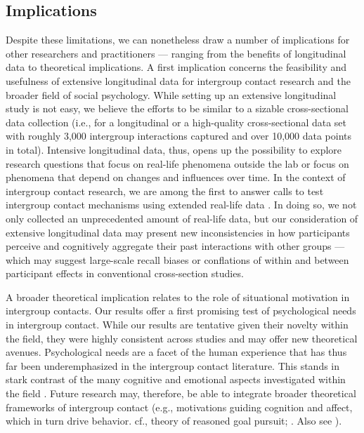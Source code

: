 \documentclass[man, 12pt, a4paper, mask]{apa7}
\theoremstyle{break}
\theoremstyle{plain}
\begin{document}
\subsection{Implications}
Despite these limitations, we can nonetheless draw a number of implications for other researchers and practitioners --- ranging from the benefits of longitudinal data to theoretical implications. A first implication concerns the feasibility and usefulness of extensive longitudinal data for intergroup contact research and the broader field of social psychology. While setting up an extensive longitudinal study is not easy, we believe the efforts to be similar to a sizable cross-sectional data collection (i.e., for a longitudinal or a high-quality cross-sectional data set with roughly 3,000 intergroup interactions captured and over 10,000 data points in total). Intensive longitudinal data, thus, opens up the possibility to explore research questions that focus on real-life phenomena outside the lab or focus on phenomena that depend on changes and influences over time. In the context of intergroup contact research, we are among the first to answer calls to test intergroup contact mechanisms using extended real-life data \citep[e.g.,][]{Pettigrew2011, MacInnis2015}. In doing so, we not only collected an unprecedented amount of real-life data, but our consideration of extensive longitudinal data may present new inconsistencies in how participants perceive and cognitively aggregate their past interactions with other groups — which may suggest large-scale recall biases or conflations of within and between participant effects in conventional cross-section studies.

A broader theoretical implication relates to the role of situational motivation in intergroup contacts. Our results offer a first promising test of psychological needs in intergroup contact. While our results are tentative given their novelty within the field, they were highly consistent across studies and may offer new theoretical avenues. Psychological needs are a facet of the human experience that has thus far been underemphasized in the intergroup contact literature. This stands in stark contrast of the many cognitive \citep[e.g.,][]{Pettigrew1998, Brown2005} and emotional aspects investigated within the field \citep[e.g.,][]{Stephan2008}. Future research may, therefore, be able to integrate broader theoretical frameworks of intergroup contact (e.g., motivations guiding cognition and affect, which in turn drive behavior. cf., theory of reasoned goal pursuit; \citealp{Ajzen2019}. Also see \citealp{Kreienkamp2022d}). 
\end{document}
